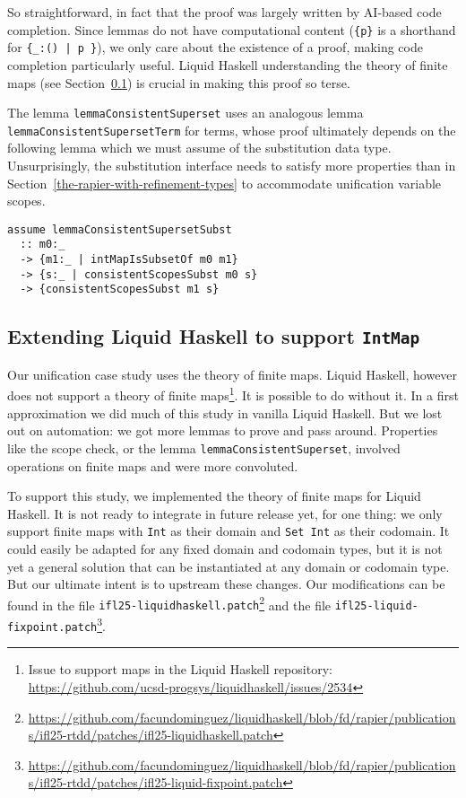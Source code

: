 \documentclass[sigconf, review]{acmart}
\newcommand{\tc}[1]{{\small\texttt{#1}}}
\newcommand{\patchfile}[1]{\tc{#1}\footnote{\scriptsize\url{https://github.com/facundominguez/liquidhaskell/blob/fd/rapier/publications/ifl25-rtdd/patches/#1}}}
\newtheorem{principle}{Principle}
\begin{document}
So straightforward, in fact that the proof was largely written by AI-based code
completion. Since lemmas do not have computational content (\tc{\{p\}} is a
shorthand for \tc{\{\_:() | p \}}), we only care about the existence of a
proof, making code completion particularly useful. Liquid Haskell understanding
the theory of finite maps (see Section~\ref{extending-liquid-haskell}) is crucial in
making this proof so terse.

The lemma \tc{lemmaConsistentSuperset} uses an analogous lemma \tc{lemma\-Consistent\-Superset\-Term} for terms,
whose proof ultimately depends on the following lemma which we must assume of the substitution data type.
Unsurprisingly, the substitution interface needs to satisfy more properties
than in Section~\ref{the-rapier-with-refinement-types} to accommodate
unification variable scopes.

\begin{verbatim}
assume lemmaConsistentSupersetSubst
  :: m0:_
  -> {m1:_ | intMapIsSubsetOf m0 m1}
  -> {s:_ | consistentScopesSubst m0 s}
  -> {consistentScopesSubst m1 s}
\end{verbatim}

\subsection{Extending Liquid Haskell to support \tc{IntMap}}
\label{extending-liquid-haskell}

Our unification case study uses the theory of finite maps. Liquid Haskell,
however does not support a theory of finite maps\footnote{Issue to support maps in
  the Liquid Haskell repository:
  \url{https://github.com/ucsd-progsys/liquidhaskell/issues/2534}}. It is
possible to do without it. In a first approximation we did much of this study in
vanilla Liquid Haskell. But we lost out on automation: we got more lemmas to prove
and pass around. Properties like the scope check, or the lemma
\tc{lemmaConsistentSuperset}, involved operations on finite maps and were more
convoluted.



To support this study, we implemented the theory of finite maps for Liquid
Haskell. It is not ready to integrate in future release yet, for one thing: we only support finite
maps with \tc{Int} as their domain and \tc{Set Int} as their codomain. It could easily be adapted for any fixed
domain and codomain types, but it is not yet a general solution that can be instantiated at any
domain or codomain type. But our ultimate intent is to upstream these changes. Our
modifications can be found in the file \patchfile{ifl25-liquidhaskell.patch} and the file \patchfile{ifl25-liquid-fixpoint.patch}.
\end{document}

